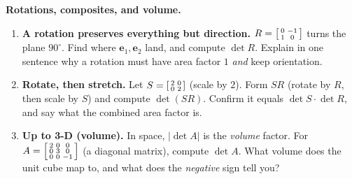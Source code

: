 \documentclass[10pt]{article}
\newcommand{\ee}{\mathbf{e}}
\begin{document}
\begin{tcolorbox}[colback=white, colframe=black!40, title=\textbf{Tier E --- Extension},
    fonttitle=\bfseries, arc=1.5mm, left=3mm, right=3mm, top=2mm, bottom=2mm, breakable]
\textbf{Rotations, composites, and volume.}
\begin{enumerate}[leftmargin=1.7em, itemsep=9pt]
  \item \textbf{A rotation preserves everything but direction.} $R=\begin{bsmallmatrix} 0 & -1 \\ 1 & 0
        \end{bsmallmatrix}$ turns the plane $90^\circ$. Find where $\ee_1,\ee_2$ land, and compute $\det R$.
        Explain in one sentence why a rotation must have area factor $1$ \emph{and} keep orientation. 
  \item \textbf{Rotate, then stretch.} Let $S=\begin{bsmallmatrix} 2 & 0 \\ 0 & 2 \end{bsmallmatrix}$
        (scale by $2$). Form $SR$ (rotate by $R$, then scale by $S$) and compute $\det(SR)$. Confirm it
        equals $\det S\cdot\det R$, and say what the combined area factor is. 
  \item \textbf{Up to 3-D (volume).} In space, $|\det A|$ is the \emph{volume} factor. For
        $A=\begin{bsmallmatrix} 2 & 0 & 0 \\ 0 & 3 & 0 \\ 0 & 0 & -1 \end{bsmallmatrix}$ (a diagonal
        matrix), compute $\det A$. What volume does the unit cube map to, and what does the \emph{negative}
        sign tell you? 
\end{enumerate}
\end{tcolorbox}
\end{document}
